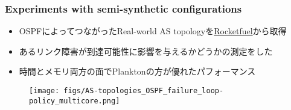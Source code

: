 \documentclass[dvipdfmx,9pt,notheorems]{beamer}
\theoremstyle{definition}
\begin{document}

\begin{frame}\frametitle{Experiments with semi-synthetic configurations}
\begin{itemize}
	\item OSPFによってつながったReal-world AS topologyを\href{https://research.cs.washington.edu/networking/rocketfuel/papers/sigcomm2002.pdf}{Rocketfuel}から取得
	\item あるリンク障害が到達可能性に影響を与えるかどうかの測定をした
	\item 時間とメモリ両方の面でPlanktonの方が優れたパフォーマンス
\end{itemize}
\begin{figure}[htb]
  \centering
	\texttt{[image: figs/AS-topologies\_OSPF\_failure\_loop-policy\_multicore.png]}
\end{figure}%
\end{frame}
\end{document}
